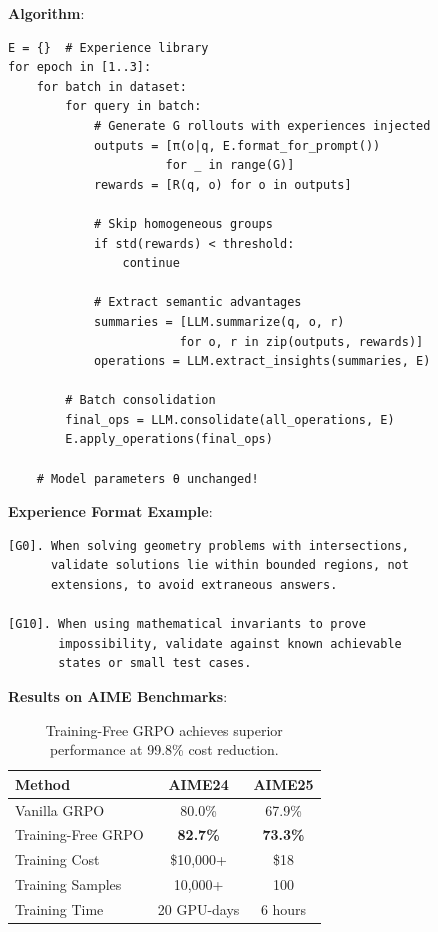 \textbf{Algorithm}:
\begin{verbatim}
E = {}  # Experience library
for epoch in [1..3]:
    for batch in dataset:
        for query in batch:
            # Generate G rollouts with experiences injected
            outputs = [π(o|q, E.format_for_prompt())
                      for _ in range(G)]
            rewards = [R(q, o) for o in outputs]

            # Skip homogeneous groups
            if std(rewards) < threshold:
                continue

            # Extract semantic advantages
            summaries = [LLM.summarize(q, o, r)
                        for o, r in zip(outputs, rewards)]
            operations = LLM.extract_insights(summaries, E)

        # Batch consolidation
        final_ops = LLM.consolidate(all_operations, E)
        E.apply_operations(final_ops)

    # Model parameters θ unchanged!
\end{verbatim}

\textbf{Experience Format Example}:
\begin{verbatim}
[G0]. When solving geometry problems with intersections,
      validate solutions lie within bounded regions, not
      extensions, to avoid extraneous answers.

[G10]. When using mathematical invariants to prove
       impossibility, validate against known achievable
       states or small test cases.
\end{verbatim}

\textbf{Results on AIME Benchmarks}:
\begin{table}[h]
\centering
\begin{tabular}{lcc}
\toprule
Method & AIME24 & AIME25 \\
\midrule
Vanilla GRPO & 80.0\% & 67.9\% \\
Training-Free GRPO & \textbf{82.7\%} & \textbf{73.3\%} \\
\midrule
Training Cost & \$10,000+ & \$18 \\
Training Samples & 10,000+ & 100 \\
Training Time & 20 GPU-days & 6 hours \\
\bottomrule
\end{tabular}
\caption{Training-Free GRPO achieves superior performance at 99.8\% cost reduction.}
\label{tab:grpo-results}
\end{table}

